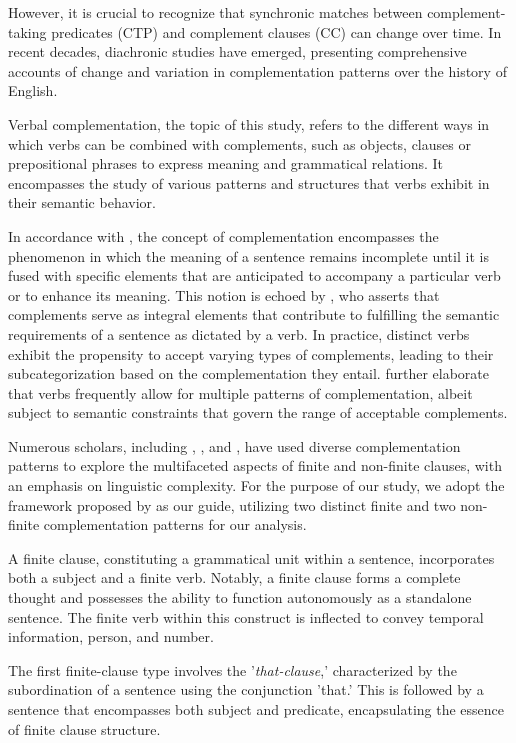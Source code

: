 \documentclass[final]{clv3} %
\begin{document}
However, it is crucial to recognize that synchronic matches between complement-taking predicates (CTP) and complement clauses (CC) can change over time. In recent decades, diachronic studies have emerged, presenting comprehensive accounts of change and variation in complementation patterns over the history of English. 

Verbal complementation, the topic of this study, refers to the different ways in which verbs can be combined with complements, such as objects, clauses or prepositional phrases to express meaning and grammatical relations. It encompasses the study of various patterns and structures that verbs exhibit in their semantic behavior. 

In accordance with \citet{somers1987valency}, the concept of complementation encompasses the phenomenon in which the meaning of a sentence remains incomplete until it is fused with specific elements that are anticipated to accompany a particular verb or to enhance its meaning. This notion is echoed by \citet{huang1997introduction}, who asserts that complements serve as integral elements that contribute to fulfilling the semantic requirements of a sentence as dictated by a verb. In practice, distinct verbs exhibit the propensity to accept varying types of complements, leading to their subcategorization based on the complementation they entail. \citet*{huddleston2005cambridge} further elaborate that verbs frequently allow for multiple patterns of complementation, albeit subject to semantic constraints that govern the range of acceptable complements.

Numerous scholars, including \citet{quirk2002old}, \citet{rohdenburg2014changing}, and \citeauthor{cuyckens2014variability}, have used diverse complementation patterns to explore the multifaceted aspects of finite and non-finite clauses, with an emphasis on linguistic complexity. For the purpose of our study, we adopt the framework proposed by \citeauthor{cuyckens2014variability} as our guide, utilizing two distinct finite and two non-finite complementation patterns for our analysis.

A finite clause, constituting a grammatical unit within a sentence, incorporates both a subject and a finite verb. Notably, a finite clause forms a complete thought and possesses the ability to function autonomously as a standalone sentence. The finite verb within this construct is inflected to convey temporal information, person, and number.

The first finite-clause type involves the '\textit{that-clause},' characterized by the subordination of a sentence using the conjunction 'that.' This is followed by a sentence that encompasses both subject and predicate, encapsulating the essence of finite clause structure.
\end{document}
